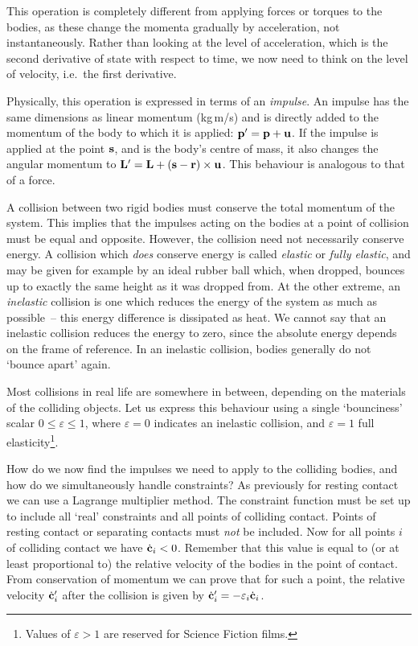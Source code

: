 This operation is completely different from applying forces or torques to the bodies, as these
change the momenta gradually by acceleration, not instantaneously. Rather than looking at the
level of acceleration, which is the second derivative of state with respect to time, we now need
to think on the level of velocity, i.e.\ the first derivative.

Physically, this operation is expressed in terms of an \emph{impulse}. An impulse  has the
same dimensions as linear momentum  (kg\,m/s) and is directly added to the momentum of the
body to which it is applied: $\ve{p}' = \ve{p} + \ve{u}$. If the impulse is applied at the point
$\ve{s}$, and  is the body's centre of mass, it also changes the angular momentum to
$\ve{L}' = \ve{L} + (\ve{s} - \ve{r})\times\ve{u}$. This behaviour is analogous to that of a
force.

A collision between two rigid bodies must conserve the total momentum of the system. This implies
that the impulses acting on the bodies at a point of collision must be equal and opposite. However,
the collision need not necessarily conserve energy. A collision which \emph{does} conserve energy
is called \emph{elastic} or \emph{fully elastic}, and may be given for example by an ideal rubber
ball which, when dropped, bounces up to exactly the same height as it was dropped from. At the
other extreme, an \emph{inelastic} collision is one which reduces the energy of the system as much
as possible~-- this energy difference is dissipated as heat. We cannot say that an inelastic
collision reduces the energy to zero, since the absolute energy depends on the frame of reference.
In an inelastic collision, bodies generally do not `bounce apart' again.

Most collisions in real life are somewhere in between, depending on the materials of the colliding
objects. Let us express this behaviour using a single `bounciness' scalar
$0 \le \varepsilon \le 1$, where $\varepsilon = 0$ indicates an inelastic collision, and
$\varepsilon = 1$ full elasticity\footnote{Values of $\varepsilon > 1$ are reserved for Science
Fiction films.}.

How do we now find the impulses we need to apply to the colliding bodies, and how do we
simultaneously handle constraints? As previously for resting contact we can use a Lagrange
multiplier method. The constraint function  must be set up to include all `real' constraints
and all points of colliding contact. Points of resting contact or separating contacts must
\emph{not} be included. Now for all points $i$ of colliding contact we have $\dot{\ve{c}}_i < 0$.
Remember that this value is equal to (or at least proportional to) the relative velocity of the
bodies in the point of contact. From conservation of momentum we can prove that for such a point,
the relative velocity $\dot{\ve{c}}_i'$ after the collision is given by
$\dot{\ve{c}}_i' = -\varepsilon_i \dot{\ve{c}}_i$.

